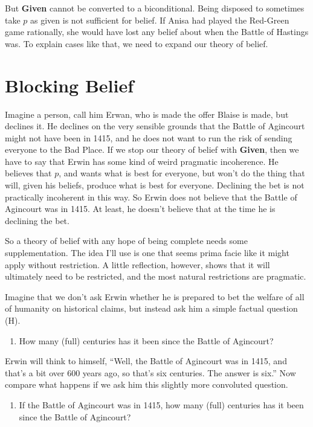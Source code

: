 \documentclass[11pt,]{book}
\providecommand{\tightlist}{%
  \setlength{\itemsep}{0pt}\setlength{\parskip}{0pt}}
\begin{document}
But \textbf{Given} cannot be converted to a biconditional. Being disposed to sometimes take \(p\) as given is not sufficient for belief. If Anisa had played the Red-Green game rationally, she would have lost any belief about when the Battle of Hastings was. To explain cases like that, we need to expand our theory of belief.

\hypertarget{block}{%
\section{Blocking Belief}\label{block}}

Imagine a person, call him Erwan, who is made the offer Blaise is made, but declines it. He declines on the very sensible grounds that the Battle of Agincourt might not have been in 1415, and he does not want to run the risk of sending everyone to the Bad Place. If we stop our theory of belief with \textbf{Given}, then we have to say that Erwin has some kind of weird pragmatic incoherence. He believes that \(p\), and wants what is best for everyone, but won't do the thing that will, given his beliefs, produce what is best for everyone. Declining the bet is not practically incoherent in this way. So Erwin does not believe that the Battle of Agincourt was in 1415. At least, he doesn't believe that at the time he is declining the bet.

So a theory of belief with any hope of being complete needs some supplementation. The idea I'll use is one that seems prima facie like it might apply without restriction. A little reflection, however, shows that it will ultimately need to be restricted, and the most natural restrictions are pragmatic.

Imagine that we don't ask Erwin whether he is prepared to bet the welfare of all of humanity on historical claims, but instead ask him a simple factual question (H).

\begin{enumerate}
\def\labelenumi{(\Alph{enumi})}
\setcounter{enumi}{7}
\tightlist
\item
  How many (full) centuries has it been since the Battle of Agincourt?
\end{enumerate}

Erwin will think to himself, ``Well, the Battle of Agincourt was in 1415, and that's a bit over 600 years ago, so that's six centuries. The answer is six.'' Now compare what happens if we ask him this slightly more convoluted question.

\begin{enumerate}
\def\labelenumi{(\Roman{enumi})}
\tightlist
\item
  If the Battle of Agincourt was in 1415, how many (full) centuries has it been since the Battle of Agincourt?
\end{enumerate}
\end{document}
